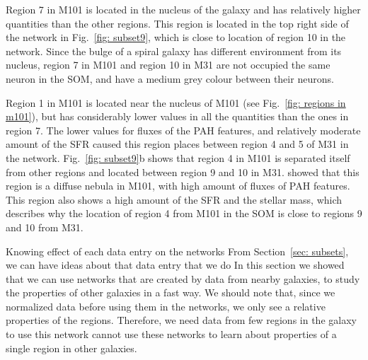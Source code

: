     Region 7 in M101 is located in the nucleus of the galaxy and has relatively higher quantities than the other regions.
    This region is located in the top right side of the network in Fig.~\ref{fig: subset9}, which is close to location of region 10 in the network.
    Since the bulge of a spiral galaxy has different environment from its nucleus, region 7 in M101 and region 10 in M31 are not occupied the same neuron in the SOM, and have a medium grey colour between their neurons.

    Region 1 in M101 is located near the nucleus of M101 (see Fig.~\ref{fig: regions in m101}), but has considerably lower values in all the quantities than the ones in region 7.
    The lower values for fluxes of the PAH features, and relatively moderate amount of the SFR caused this region places between region 4 and 5 of M31 in the network. 
    Fig.~\ref{fig: subset9}b shows that region 4 in M101 is separated itself from other regions and located between region 9 and 10 in M31.
    \cite{Gordon08} showed that this region is a diffuse nebula in M101, with high amount of fluxes of PAH features. 
    This region also shows a high amount of the SFR and the stellar mass, which describes why the location of region 4 from M101 in the SOM is close to regions 9 and 10 from M31.
    
    Knowing effect of each data entry on the networks From Section~\ref{sec: subsets}, we can have ideas about that data entry that we do
    In this section we showed that we can use networks that are created by data from nearby galaxies, to study the properties of other galaxies in a fast way.
    We should note that, since we normalized data before using them in the networks, we only see a relative properties of the regions.
    Therefore, we need data from few regions in the galaxy to use this network cannot use these networks to learn about properties of a single region in other galaxies.
    
    